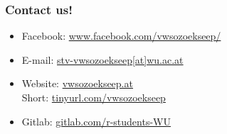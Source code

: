\documentclass{beamer}
\begin{document}
\begin{frame}
  \frametitle{Contact us!}
  \begin{itemize}
  \item Facebook: \href{https://www.facebook.com/vwsozoekseep/}{www.facebook.com/vwsozoekseep/}
  \item E-mail: \href{mailto:stv-vwsozoekseep@wu.ac.at}{stv-vwsozoekseep[at]wu.ac.at}
  \item Website: \href{http://vwsozoekseep.at/}{vwsozoekseep.at} \\
    Short: \href{https://tinyurl.com/vwsozoekseep}{tinyurl.com/vwsozoekseep}
  \item Gitlab: \href{https://gitlab.com/r-students-WU}{gitlab.com/r-students-WU}
  \end{itemize}
\end{frame}
\end{document}
